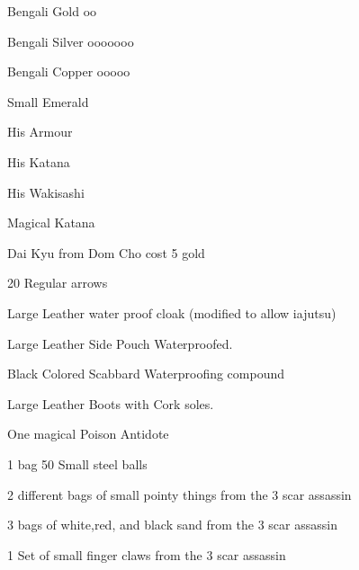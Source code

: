 \documentclass[10pt]{report}
\begin{document}
\begin{description}
        \item Bengali Gold oo
        \item Bengali Silver ooooooo
        \item Bengali Copper ooooo
        \item Small Emerald
        \item His Armour
        \item His Katana
        \item His Wakisashi
        \item Magical Katana
        \item Dai Kyu from Dom Cho   cost 5 gold
        \item 20 Regular arrows
        \item Large Leather water proof cloak (modified to allow iajutsu)
        \item Large Leather Side Pouch    Waterproofed.
        \item Black Colored Scabbard Waterproofing compound
        \item Large Leather Boots with Cork soles.
        \item One magical Poison Antidote
        \item 1 bag 50 Small steel balls
        \item 2 different bags of small pointy things from the 3 scar assassin
        \item 3 bags of white,red, and black sand from the 3 scar assassin
        \item 1 Set of small finger claws from the 3 scar assassin
\end{description}
\end{document}
